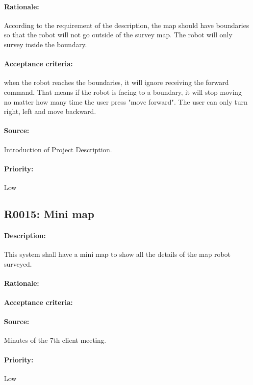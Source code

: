 \documentclass[11pt, a4paper]{report}
\begin{document}
\paragraph{Rationale:}
According to the requirement of the description, the map should have boundaries so that the robot will not go outside of the survey map. The robot will only survey inside the boundary.
\paragraph{Acceptance criteria:}
when the robot reaches the boundaries, it will ignore receiving the forward command. That means if the robot is facing to a boundary, it will stop moving no matter how many time the user press "move forward". The user can only turn right, left and move backward.
\paragraph{Source:}
 Introduction of Project Description.
\paragraph{Priority:}
Low


\subsection{R0015: Mini map}
\paragraph{Description:}
This system shall have a mini map to show all the details of the map robot surveyed.
\paragraph{Rationale:}

\paragraph{Acceptance criteria:}

\paragraph{Source:}
Minutes of the 7th client meeting.
\paragraph{Priority:}
Low
\end{document}
